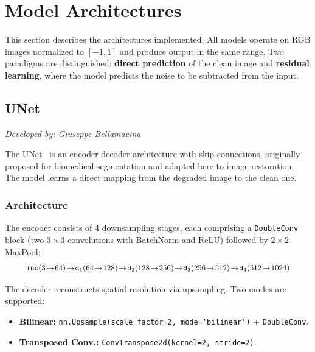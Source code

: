 \section{Model Architectures}
\label{sec:models}

This section describes the architectures implemented. All models operate on RGB images normalized to $[-1, 1]$ and produce output in the same range. Two paradigms are distinguished: \textbf{direct prediction} of the clean image and \textbf{residual learning}, where the model predicts the noise to be subtracted from the input.

\subsection{UNet}
\label{subsec:unet}

\textit{Developed by: Giuseppe Bellamacina}

\medskip

The UNet~\cite{unet} is an encoder-decoder architecture with skip connections, originally proposed for biomedical segmentation and adapted here to image restoration. The model learns a direct mapping from the degraded image to the clean one.

\subsubsection{Architecture}
The encoder consists of 4 downsampling stages, each comprising a \texttt{DoubleConv} block (two $3\!\times\!3$ convolutions with BatchNorm and ReLU) followed by $2\!\times\!2$ MaxPool:
\begin{equation}
\resizebox{0.9\columnwidth}{!}{$\texttt{inc}(3 \!\to\! 64) \!\to\! \texttt{d}_1(64 \!\to\! 128) \!\to\! \texttt{d}_2(128 \!\to\! 256) \!\to\! \texttt{d}_3(256 \!\to\! 512) \!\to\! \texttt{d}_4(512 \!\to\! 1024)$}
\end{equation}

The decoder reconstructs spatial resolution via upsampling. Two modes are supported:
\begin{itemize}
    \item \textbf{Bilinear:} {\footnotesize\texttt{nn.Upsample(scale\_factor=2, mode=`bilinear')}} + \texttt{DoubleConv}.
    \item \textbf{Transposed Conv.:} \texttt{ConvTranspose2d(\allowbreak{}kernel=2, stride=2)}.
\end{itemize}

